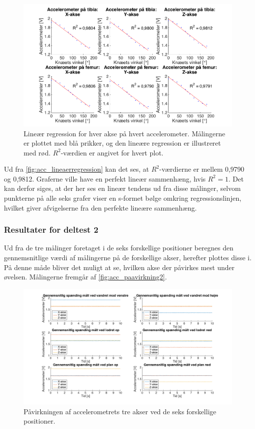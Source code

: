 \begin{figure}[H]
\centering
\includegraphics[width=1.0\textwidth]{figures/lineaerregression}
\caption{Lineær regression for hver akse på hvert accelerometer. Målingerne er plottet med blå prikker, og den lineære regression er illustreret med rød. $R^2$-værdien er angivet for hvert plot.}
\label{fig:acc_lineaerregression}
\end{figure}

Ud fra \autoref{fig:acc_lineaerregression} kan det ses, at $R^2$-værdierne er mellem 0,9790 og 0,9812. Graferne ville have en perfekt lineær sammenhæng, hvis $R^2=1$. Det kan derfor siges, at der her ses en lineær tendens ud fra disse målinger, selvom punkterne på alle seks grafer viser en s-formet bølge omkring regressionslinjen, hvilket giver afvigelserne fra den perfekte lineære sammenhæng.

\subsubsection{Resultater for deltest 2}
Ud fra de tre målinger foretaget i de seks forskellige positioner beregnes den gennemsnitlige værdi af målingerne på de forskellige akser, herefter plottes disse i. På denne måde bliver det muligt at se, hvilken akse der påvirkes mest under øvelsen. Målingerne fremgår af \autoref{fig:acc_paavirkning2}. 

\begin{figure}[H]
\centering
\includegraphics[width=1.0\textwidth]{figures/paavirkning}
\caption{Påvirkningen af accelerometrets tre akser ved de seks forskellige positioner.}
\label{fig:acc_paavirkning2}
\end{figure}

